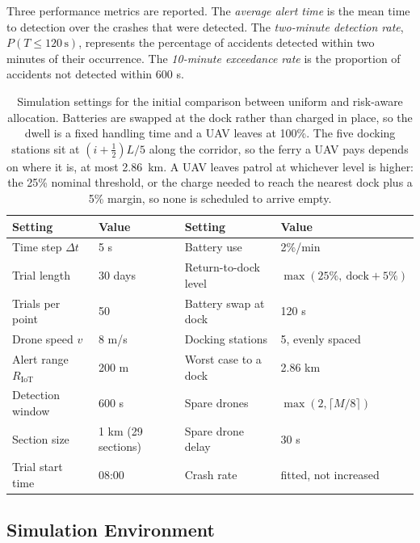 \documentclass[11pt]{article}
\begin{document}
Three performance metrics are reported. The \emph{average alert time} is the mean time to detection over the crashes that were detected. The \emph{two-minute detection rate}, $P(T\leq 120\,\mathrm{s})$, represents the percentage of accidents detected within two minutes of their occurrence. The \emph{10-minute exceedance rate} is the proportion of accidents not detected within 600 s.

\begin{table}[htbp]
\centering
\caption{Simulation settings for the initial comparison
between uniform and risk-aware allocation. Batteries are swapped at the dock
rather than charged in place, so the dwell is a fixed handling time and a UAV
leaves at 100\%. The five docking stations sit at $(i+\tfrac{1}{2})L/5$ along
the corridor, so the ferry a UAV pays depends on where it is, at most
2.86~km. A UAV leaves patrol at whichever level is higher: the 25\% nominal
threshold, or the charge needed to reach the nearest dock plus a 5\% margin,
so none is scheduled to arrive empty.}
\label{tab:params}
\small
\begin{tabular}{@{}llll@{}}
\toprule
\textbf{Setting} & \textbf{Value} & \textbf{Setting} & \textbf{Value} \\
\midrule
Time step $\Delta t$        & 5 s     & Battery use              & 2\%/min \\
Trial length                & 30 days & Return-to-dock level     & $\max(25\%,\ \text{dock}+5\%)$ \\
Trials per point            & 50      & Battery swap at dock     & 120 s \\
Drone speed $v$             & 8 m/s   & Docking stations         & 5, evenly spaced \\
Alert range $R_{\mathrm{IoT}}$ & 200 m & Worst case to a dock     & 2.86 km \\
Detection window            & 600 s   & Spare drones             & $\max(2,\lceil M/8\rceil)$ \\
Section size                & 1 km (29 sections) & Spare drone delay & 30 s \\
Trial start time            & 08:00   & Crash rate               & fitted, not increased \\
\bottomrule
\end{tabular}
\end{table}

\subsection{Simulation Environment}
\label{sec:impl}
\end{document}
